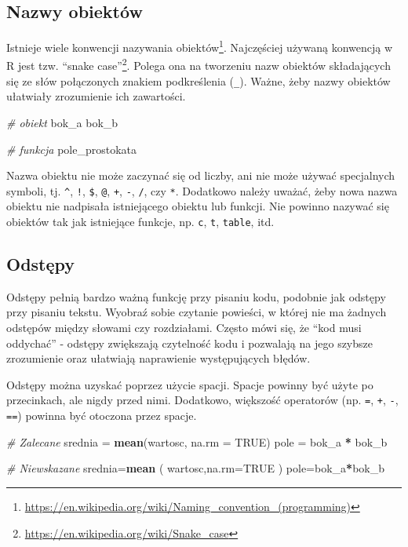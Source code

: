 \documentclass[paper=6in:9in,pagesize=pdftex,headinclude=on,footinclude=on,10pt]{scrbook}
\newenvironment{Shaded}{\begin{snugshade}}{\end{snugshade}}
\newcommand{\CommentTok}[1]{\textcolor[rgb]{0.56,0.35,0.01}{\textit{#1}}}
\newcommand{\DataTypeTok}[1]{\textcolor[rgb]{0.13,0.29,0.53}{#1}}
\newcommand{\KeywordTok}[1]{\textcolor[rgb]{0.13,0.29,0.53}{\textbf{#1}}}
\newcommand{\NormalTok}[1]{#1}
\newcommand{\OperatorTok}[1]{\textcolor[rgb]{0.81,0.36,0.00}{\textbf{#1}}}
\newcommand{\OtherTok}[1]{\textcolor[rgb]{0.56,0.35,0.01}{#1}}
\newcommand{\StringTok}[1]{\textcolor[rgb]{0.31,0.60,0.02}{#1}}
\DeclareRobustCommand{\href}[2]{#2\footnote{\url{#1}}}
\begin{document}
\hypertarget{nazwy-obiektow}{%
\subsection{Nazwy obiektów}\label{nazwy-obiektow}}

Istnieje wiele konwencji nazywania obiektów\footnote{\url{https://en.wikipedia.org/wiki/Naming_convention_(programming)}}.
Najczęściej używaną konwencją w R jest tzw. \href{https://en.wikipedia.org/wiki/Snake_case}{``snake case''}.
Polega ona na tworzeniu nazw obiektów składających się ze słów połączonych znakiem podkreślenia (\texttt{\_}).
Ważne, żeby nazwy obiektów ułatwiały zrozumienie ich zawartości.

\begin{Shaded}
\begin{Highlighting}[]
\CommentTok{# obiekt}
\NormalTok{bok_a}
\NormalTok{bok_b}

\CommentTok{# funkcja}
\NormalTok{pole_prostokata}
\end{Highlighting}
\end{Shaded}

Nazwa obiektu nie może zaczynać się od liczby, ani nie może używać specjalnych symboli, tj. \texttt{\^{}}, \texttt{!}, \texttt{\$}, \texttt{@}, \texttt{+}, \texttt{-}, \texttt{/}, czy \texttt{*}.
Dodatkowo należy uważać, żeby nowa nazwa obiektu nie nadpisała istniejącego obiektu lub funkcji.
Nie powinno nazywać się obiektów tak jak istniejące funkcje, np. \texttt{c}, \texttt{t}, \texttt{table}, itd.

\hypertarget{odstux119py}{%
\subsection{Odstępy}\label{odstux119py}}

Odstępy pełnią bardzo ważną funkcję przy pisaniu kodu, podobnie jak odstępy przy pisaniu tekstu.
Wyobraź sobie czytanie powieści, w której nie ma żadnych odstępów między słowami czy rozdziałami.
Często mówi się, że ``kod musi oddychać'' - odstępy zwiększają czytelność kodu i pozwalają na jego szybsze zrozumienie oraz ułatwiają naprawienie występujących błędów.

Odstępy można uzyskać poprzez użycie spacji.
Spacje powinny być użyte po przecinkach, ale nigdy przed nimi.
Dodatkowo, większość operatorów (np. \texttt{=}, \texttt{+}, \texttt{-}, \texttt{==}) powinna być otoczona przez spacje.

\begin{Shaded}
\begin{Highlighting}[]
\CommentTok{# Zalecane}
\NormalTok{srednia =}\StringTok{ }\KeywordTok{mean}\NormalTok{(wartosc, }\DataTypeTok{na.rm =} \OtherTok{TRUE}\NormalTok{)}
\NormalTok{pole =}\StringTok{ }\NormalTok{bok_a }\OperatorTok{*}\StringTok{ }\NormalTok{bok_b}

\CommentTok{# Niewskazane}
\NormalTok{srednia=}\KeywordTok{mean}\NormalTok{ ( wartosc,}\DataTypeTok{na.rm=}\OtherTok{TRUE}\NormalTok{ ) }
\NormalTok{pole=bok_a}\OperatorTok{*}\NormalTok{bok_b}
\end{Highlighting}
\end{Shaded}
\end{document}

